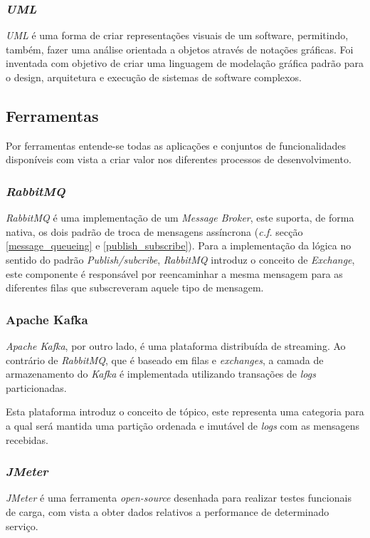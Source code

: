 \subsubsection{\emph{\acrfull{UML}}}

\emph{\acrshort{UML}} é uma forma de criar representações visuais de um software, permitindo, também, fazer uma análise orientada a objetos através de notações gráficas. Foi inventada com objetivo de criar uma linguagem de modelação gráfica padrão para o design, arquitetura e execução de sistemas de software complexos\cite{uml}.

\subsection{Ferramentas}
Por ferramentas entende-se todas as aplicações e conjuntos de funcionalidades disponíveis com vista a criar valor nos diferentes processos de desenvolvimento\cite{software_tools}.

\subsubsection{\emph{RabbitMQ}}
\emph{RabbitMQ} é uma implementação de um \emph{Message Broker}, este suporta, de forma nativa, os dois padrão de troca de mensagens assíncrona (\emph{c.f.} secção \ref{message_queueing} e \ref{publish_subscribe}). Para a implementação da lógica no sentido do padrão \emph{Publish/subcribe}, \emph{RabbitMQ} introduz o conceito de \emph{Exchange}, este componente é responsável por reencaminhar a mesma mensagem para as diferentes filas que subscreveram aquele tipo de mensagem.

\subsubsection{Apache Kafka}
\emph{Apache Kafka}, por outro lado, é uma plataforma distribuída de streaming. Ao contrário de \emph{RabbitMQ}, que é baseado em filas e \emph{exchanges}, a camada de armazenamento do \emph{Kafka} é implementada utilizando transações de \emph{logs} particionadas.

Esta plataforma introduz o conceito de tópico, este representa uma categoria para a qual será mantida uma partição ordenada e imutável de \emph{logs} com as mensagens recebidas.

\subsubsection{\emph{JMeter} \label{estado_arte_jmeter}}
\emph{JMeter} é uma ferramenta \emph{open-source} desenhada para realizar testes funcionais de carga, com vista a obter dados relativos a performance de determinado serviço\cite{jmeter}.

